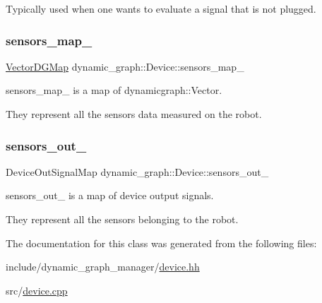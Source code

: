 Typically used when one wants to evaluate a signal that is not plugged. \mbox{\label{classdynamic__graph_1_1Device_a338b04580b75994516b8cc04d6605541}} 
\subsubsection{\texorpdfstring{sensors\+\_\+map\+\_\+}{sensors\_map\_}}
{\footnotesize\ttfamily \hyperlink{namespacedynamic__graph_a51212ed7fa4ae81e7b362a27f09b7ab8}{Vector\+D\+G\+Map} dynamic\+\_\+graph\+::\+Device\+::sensors\+\_\+map\+\_\+}



sensors\+\_\+map\+\_\+ is a map of dynamicgraph\+::\+Vector. 

They represent all the sensors data measured on the robot. \mbox{\label{classdynamic__graph_1_1Device_ab397e65116cdc32ffa767bfc92c0b7e0}} 
\subsubsection{\texorpdfstring{sensors\+\_\+out\+\_\+}{sensors\_out\_}}
{\footnotesize\ttfamily Device\+Out\+Signal\+Map dynamic\+\_\+graph\+::\+Device\+::sensors\+\_\+out\+\_\+}



sensors\+\_\+out\+\_\+ is a map of device output signals. 

They represent all the sensors belonging to the robot. 

The documentation for this class was generated from the following files\+:\begin{DoxyCompactItemize}
\item 
include/dynamic\+\_\+graph\+\_\+manager/\hyperlink{device_8hh}{device.\+hh}\item 
src/\hyperlink{device_8cpp}{device.\+cpp}\end{DoxyCompactItemize}
